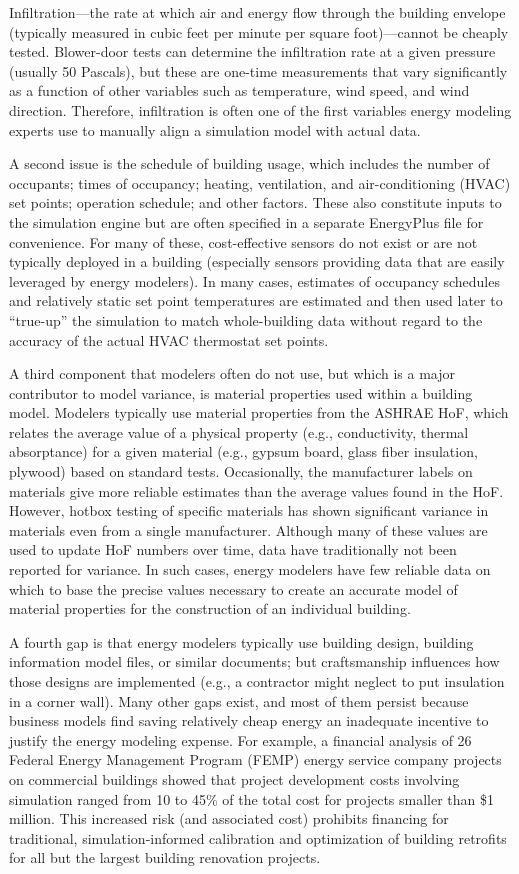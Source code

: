 \documentclass[preprint, review, 12pt]{elsarticle}
\begin{document}
Infiltration---the rate at which air and energy flow through the building envelope (typically measured in cubic feet per minute per square foot)---cannot be cheaply tested. Blower-door tests can determine the infiltration rate at a given pressure (usually 50 Pascals), but these are one-time measurements that vary significantly as a function of other variables such as temperature, wind speed, and wind direction. Therefore, infiltration is often one of the first variables energy modeling experts use to manually align a simulation model with actual data.

A second issue is the schedule of building usage, which includes the number of occupants; times of occupancy; heating, ventilation, and air-conditioning (HVAC) set points; operation schedule; and other factors. These also constitute inputs to the simulation engine but are often specified in a separate EnergyPlus file for convenience. For many of these, cost-effective sensors do not exist or are not typically deployed in a building (especially sensors providing data that are easily leveraged by energy modelers). In many cases, estimates of occupancy schedules and relatively static set point temperatures are estimated and then used later to ``true-up'' the simulation to match whole-building data without regard to the accuracy of the actual HVAC thermostat set points.

A third component that modelers often do not use, but which is a major contributor to model variance, is material properties used within a building model. Modelers typically use material properties from the ASHRAE HoF, which relates the average value of a physical property (e.g., conductivity, thermal absorptance) for a given material (e.g., gypsum board, glass fiber insulation, plywood) based on standard tests. Occasionally, the manufacturer labels on materials give more reliable estimates than the average values found in the HoF. However, hotbox testing of specific materials has shown significant variance in materials even from a single manufacturer. Although many of these values are used to update HoF numbers over time, data have traditionally not been reported for variance.  In such cases, energy modelers have few reliable data on which to base the precise values necessary to create an accurate model of material properties for the construction of an individual building.

A fourth gap is that energy modelers typically use building design, building information model files, or similar documents; but craftsmanship influences how those designs are implemented (e.g., a contractor might neglect to put insulation in a corner wall). Many other gaps exist, and most of them persist because business models find saving relatively cheap energy an inadequate incentive to justify the energy modeling expense. For example, a financial analysis of 26 Federal Energy Management Program (FEMP) energy service company projects on commercial buildings showed that project development costs involving simulation ranged from 10 to 45\% of the total cost for projects smaller than \$1 million. This increased risk (and associated cost) prohibits financing for traditional, simulation-informed calibration and optimization of building retrofits for all but the largest building renovation projects.
\end{document}
